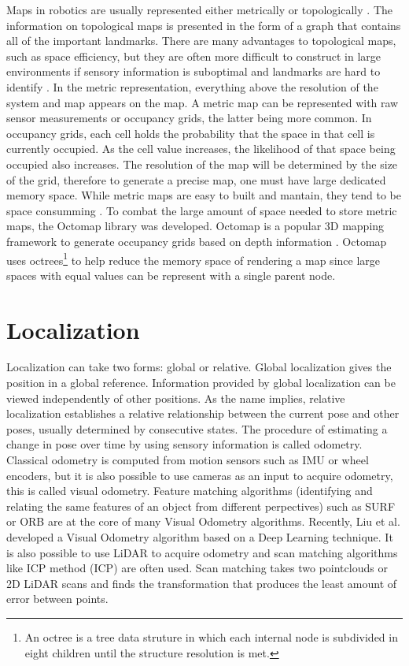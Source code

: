 Maps in robotics are usually represented either metrically or topologically \cite{thrun_learning_1998}. The information on topological maps is presented in the form of a graph that contains all of the important landmarks. There are many advantages to topological maps, such as space efficiency, but they are often more difficult to construct in large environments if sensory information is suboptimal and landmarks are hard to identify \cite{thrun_learning_1998}. In the metric representation, everything above the resolution of the system and map appears on the map. A metric map can be represented with raw sensor measurements or occupancy grids, the latter being more common. In occupancy grids, each cell holds the probability that the space in that cell is currently occupied. As the cell value increases, the likelihood of that space being occupied also increases. The resolution of the map will be determined by the size of the grid, therefore to generate a precise map, one must have large dedicated memory space. While metric maps are easy to built and mantain, they tend to be space consumming \cite{thrun_learning_1998}. To combat the large amount of space needed to store metric maps, the Octomap library was developed. 
Octomap is a popular 3D mapping framework to generate occupancy grids based on depth information \cite{hornung_octomap_2013}. Octomap uses octrees\footnote{An octree is a tree data struture in which each internal node is subdivided in eight children until the structure resolution is met.} to help reduce the memory space of rendering a map since large spaces with equal values can be represent with a single parent node.

\section{Localization}
Localization can take two forms: global or relative. Global localization gives the position in a global reference. Information provided by global localization can be viewed independently of other positions. As the name implies, relative localization establishes a relative relationship between the current pose and other poses, usually determined by consecutive states. The procedure of estimating a change in pose over time by using sensory information is called odometry. Classical odometry is computed from motion sensors such as \acs*{IMU} or wheel encoders, but it is also possible to use cameras as an input to acquire odometry, this is called visual odometry. Feature matching algorithms (identifying and relating the same features of an object from different perpectives) such as SURF \cite{leonardis_surf_2006} or ORB \cite{rublee_orb_2011} are at the core of many Visual Odometry algorithms. Recently, Liu et al. \cite{liu_visual_2021} developed a Visual Odometry algorithm based on a Deep Learning technique.
It is also possible to use \acs*{LiDAR} to acquire odometry and scan matching algorithms like \acl*{ICP} method (\acs*{ICP}) are often used. Scan matching takes two pointclouds or 2D \acs*{LiDAR} scans and finds the transformation that produces the least amount of error between points.

